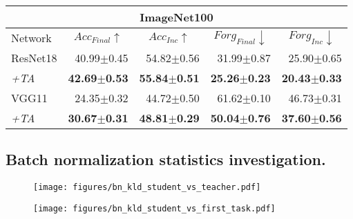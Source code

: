 \begin{appendix}
\begin{table}[!h]
{\begin{tabular}{lrrrr}
\multicolumn{5}{c}{\large{ImageNet100}} \\ \midrule
Network      & \multicolumn{1}{c}{$Acc_{Final} \uparrow$} & \multicolumn{1}{c}{$Acc_{Inc} \uparrow$} & \multicolumn{1}{c}{$Forg_{Final} \downarrow$} & \multicolumn{1}{c}{$Forg_{Inc} \downarrow$} \\ \midrule
ResNet18     & 40.99$\pm$0.45                    & 54.82$\pm$0.56                  & 31.99$\pm$0.87                     & 25.90$\pm$0.65                   \\
\textit{+TA} & \textbf{42.69$\pm$0.53}           & \textbf{55.84$\pm$0.51}         & \textbf{25.26$\pm$0.23}            & \textbf{20.43$\pm$0.33}          \\ \midrule
VGG11        & 24.35$\pm$0.32                    & 44.72$\pm$0.50                  & 61.62$\pm$0.10                     & 46.73$\pm$0.31                   \\
\textit{+TA} & \textbf{30.67$\pm$0.31}           & \textbf{48.81$\pm$0.29}         & \textbf{50.04$\pm$0.76}            & \textbf{37.60$\pm$0.56}         \\ \bottomrule
\end{tabular}%

}
\caption{}
\label{tab:networks_ablation}
\end{table}



\subsection{Batch normalization statistics investigation.} 


\begin{figure*}[!ht]
    \centering
    \begin{subfigure}[b]{0.49\textwidth}
        \centering
        \texttt{[image: figures/bn\_kld\_student\_vs\_teacher.pdf]}
    \end{subfigure}
    \begin{subfigure}[b]{0.49\textwidth}
        \centering
        \texttt{[image: figures/bn\_kld\_student\_vs\_first\_task.pdf]}
    \end{subfigure}
   \caption{
   }
   \label{fig:kld}
\end{figure*}


\end{appendix}
